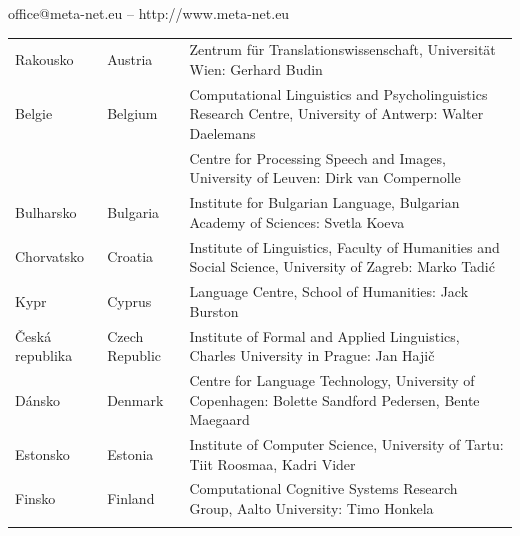 \documentclass[]{../../metanetpaper}
\begin{document}
\vfill
\centerline{office@meta-net.eu -- http://www.meta-net.eu}

\cleardoublepage

\appendix
{}




\cleardoublepage



\label{metanetmembers}

\small
\begin{longtable}{@{}llp{113mm}@{}}
  Rakousko & \textcolor{grey1}{Austria} & Zentrum für Translationswissenschaft, Universität Wien: Gerhard Budin\\ \addlinespace 
  Belgie & \textcolor{grey1}{Belgium} & Computational Linguistics and Psycholinguistics Research Centre, University of Antwerp: Walter Daelemans\\ \addlinespace
  & & Centre for Processing Speech and Images, University of Leuven: Dirk van Compernolle \\ \addlinespace
  Bulharsko & \textcolor{grey1}{Bulgaria} & Institute for Bulgarian Language, Bulgarian Academy of Sciences: Svetla Koeva \\ \addlinespace
  Chorvatsko & \textcolor{grey1}{Croatia} & Institute of Linguistics, Faculty of Humanities and Social Science, University of Zagreb: Marko Tadić \\ \addlinespace
  Kypr & \textcolor{grey1}{Cyprus} & Language Centre, School of Humanities: Jack Burston \\ \addlinespace
  Česká republika & \textcolor{grey1}{Czech Republic} & Institute of Formal and Applied Linguistics, Charles University in Prague: Jan Hajič \\ \addlinespace 
  Dánsko &  \textcolor{grey1}{Denmark} & Centre for Language Technology, University of Copenhagen: \newline Bolette Sandford Pedersen, Bente Maegaard\\ \addlinespace
  Estonsko & \textcolor{grey1}{Estonia} & Institute of Computer Science, University of Tartu: Tiit Roosmaa, Kadri Vider\\ \addlinespace
  Finsko & \textcolor{grey1}{Finland} & Computational Cognitive Systems Research Group, Aalto University: Timo Honkela\\ \addlinespace

\end{longtable}
\end{document}
